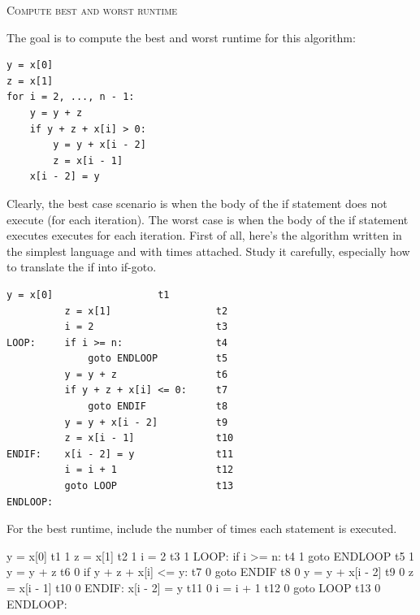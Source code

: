 

\LATEXHELPTHREEFIVEZERO

\TURNPAGE

\newpage
\textsc{Compute best and worst runtime}

The goal is to compute the best and worst runtime for this algorithm:
\begin{Verbatim}[frame=single,fontsize=\small]
y = x[0]
z = x[1]
for i = 2, ..., n - 1:
    y = y + z
    if y + z + x[i] > 0:
        y = y + x[i - 2]
        z = x[i - 1]
    x[i - 2] = y
\end{Verbatim}
Clearly, the best case scenario is when the body of the if statement does not
execute
(for each iteration).
The worst case is when the body of the if statement executes executes
for each iteration.
First of all, here's the algorithm written in the simplest language
and with times attached.
Study it carefully, especially how to translate the if into
if-goto.
\begin{Verbatim}[frame=single,fontsize=\small]
          y = x[0]                  t1      
          z = x[1]                  t2     
          i = 2                     t3      
LOOP:     if i >= n:                t4      
              goto ENDLOOP          t5 
          y = y + z                 t6      
          if y + z + x[i] <= 0:     t7
              goto ENDIF            t8
          y = y + x[i - 2]          t9
          z = x[i - 1]              t10
ENDIF:    x[i - 2] = y              t11
          i = i + 1                 t12
          goto LOOP                 t13
ENDLOOP:
\end{Verbatim}

\TURNPAGE
\newpage

\nextq
For the best runtime,
include the number of times each statement is executed.
\\
\ANSWER
\begin{answercode}
          y = x[0]                  t1    1
          z = x[1]                  t2    1
          i = 2                     t3    1
LOOP:     if i >= n:                t4    1
              goto ENDLOOP          t5    1
          y = y + z                 t6    0
          if y + z + x[i] <= y:     t7    0
              goto ENDIF            t8    0
          y = y + x[i - 2]          t9    0
          z = x[i - 1]              t10   0
ENDIF:    x[i - 2] = y              t11   0
          i = i + 1                 t12   0
          goto LOOP                 t13   0
ENDLOOP:
\end{answercode}


